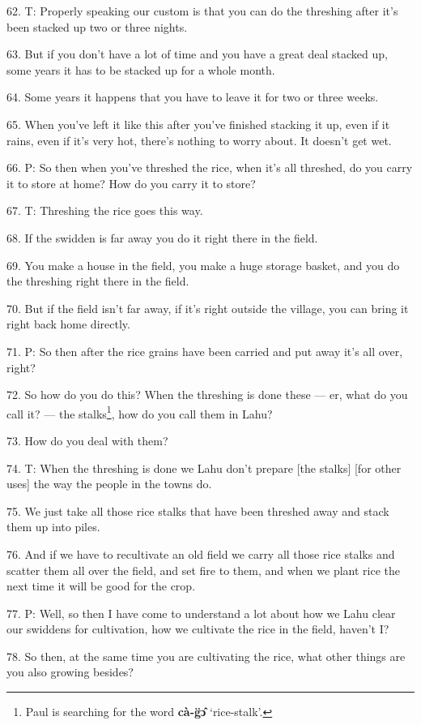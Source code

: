 62. T: Properly speaking our custom is that you can do the threshing after
it's been stacked up two or three nights.

63. But if you don't have a lot of time and you have a great deal stacked up, some
years it has to be stacked up for a whole month.

64. Some years it happens that you have to leave it for two or three weeks.

65. When you've left it like this after you've finished stacking it up, even if
it rains, even if it's very hot, there's nothing to worry about. It doesn't get
wet.

66. P: So then when you've threshed the rice, when it's all threshed, do you
carry it to store at home? How do you carry it to store?

67. T: Threshing the rice goes this way.

68. If the swidden is far away you do it right there in the field.

69. You make a house in the field, you make a huge storage basket, and you do the
threshing right there in the field.

70. But if the field isn't far away, if it's right outside the village, you can
bring it right back home directly.

71. P: So then after the rice grains have been carried and put away it's all
over, right?

72. So how do you do this? When the threshing is done these --- er, what do you
call it? --- the stalks\footnote{Paul is searching for the word \textbf{cà-g̈ɔ̂} `rice-stalk'.}, how do you call them in Lahu?

73. How do you deal with them?

74. T: When the threshing is done we Lahu don't prepare [the stalks] [for other
uses] the way the people in the towns do.

75. We just take all those rice stalks that have been threshed away and stack them
up into piles.

76. And if we have to recultivate an old field we carry all those rice stalks and
scatter them all over the field, and set fire to them, and when we plant rice the
next time it will be good for the crop.

77. P: Well, so then I have come to understand a lot about how we Lahu clear
our swiddens for cultivation, how we cultivate the rice in the field, haven't I?

78. So then, at the same time you are cultivating the rice, what other things are
you also growing besides?

